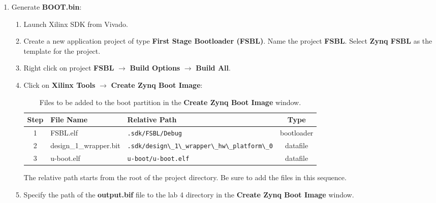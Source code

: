 \documentclass[11pt,letterpaper,titlepage]{article}
\begin{document}
\begin{enumerate}
\begin{enumerate}
    \end{enumerate}
    
    \item Generate \textbf{BOOT.bin}:
    
    \begin{enumerate}
        
        \item Launch Xilinx SDK from Vivado.
        
        \item Create a new application project of type \textbf{First Stage Bootloader (FSBL)}. Name the project \textbf{FSBL}. Select \textbf{Zynq FSBL} as the template for the project.
        
        \item Right click on project \textbf{FSBL} $\rightarrow$ \textbf{Build Options} $\rightarrow$ \textbf{Build All}.
        
        \item Click on \textbf{Xilinx Tools} $\rightarrow$ \textbf{Create Zynq Boot Image}:
        
        \begin{table}[h!]
        \centering
        \begin{tabular}{@{}cllc@{}}
        \toprule
        Step & File Name              & Relative Path                                                  & Type       \\ \midrule
        1    & FSBL.elf               & \verb|.sdk/FSBL/Debug|                          & bootloader \\ \midrule
        2    & design\_1\_wrapper.bit & \verb|.sdk/design\_1\_wrapper\_hw\_platform\_0| & datafile   \\ \midrule
        3    & u-boot.elf             & \verb|u-boot/u-boot.elf|                        & datafile   \\ \bottomrule
        \end{tabular}
        \caption{Files to be added to the boot partition in the \textbf{Create Zynq Boot Image} window.}
        \end{table}
        
        The relative path starts from the root of the project directory. Be sure to add the files in this sequence.
        
        \item Specify the path of the \textbf{output.bif} file to the lab 4 directory in the \textbf{Create Zynq Boot Image} window.
        

\end{enumerate}
\end{enumerate}
\end{document}
